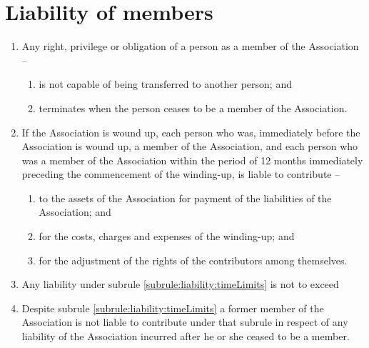 \section{Liability of members}
\label{rule:liability}

\begin{enumerate}
	\item Any right, privilege or obligation of a person as a member of the Association --
	\begin{enumerate}
		\item is not capable of being transferred to another person; and
		\item terminates when the person ceases to be a member of the Association.
	\end{enumerate}
	
	\item \label{subrule:liability:timeLimits} If the Association is wound up, each person who was, immediately before the Association is wound up, a member of the Association, and each person who was a member of the Association within the period of 12 months immediately preceding the commencement of the winding-up, is liable to contribute --
	\begin{enumerate}
		\item to the assets of the Association for payment of the liabilities of the Association; and
		\item for the costs, charges and expenses of the winding-up; and
		\item for the adjustment of the rights of the contributors among themselves.
	\end{enumerate}
	
	\item Any liability under subrule \ref{subrule:liability:timeLimits} is not to exceed \orgLiabilityLimit{}
	\item Despite subrule \ref{subrule:liability:timeLimits} a former member of the Association is not liable to contribute under that subrule in respect of any liability of the Association incurred after he or she ceased to be a member.
	
\end{enumerate}